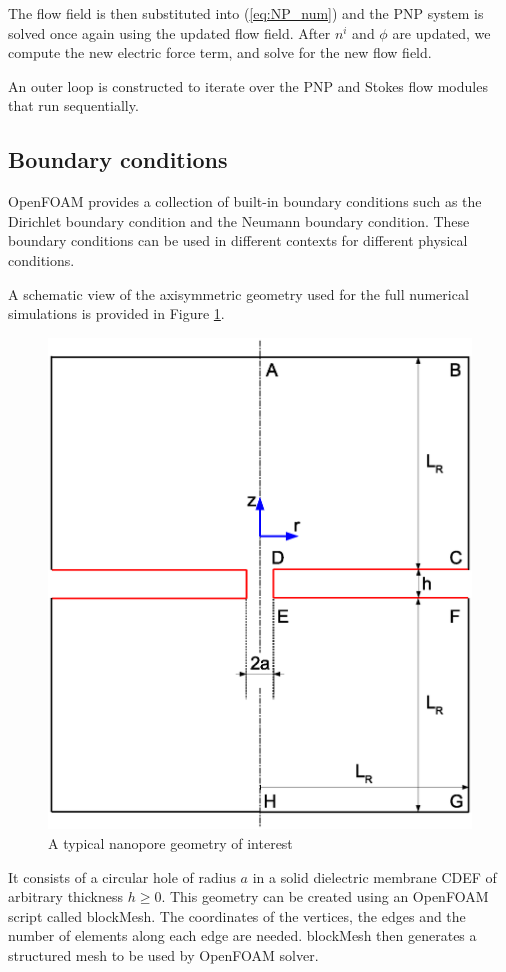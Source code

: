 The flow field is then substituted into (\ref{eq:NP_num}) and the PNP system is solved once again using the updated flow field. After $n^i$ and $\phi$ are updated, we compute the new electric force term, and solve for the new flow field.

An outer loop is constructed to iterate over the PNP and Stokes flow modules that run sequentially.

\subsection{Boundary conditions}
OpenFOAM provides a collection of built-in boundary conditions such as the Dirichlet boundary condition and the Neumann boundary condition. These boundary conditions can be used in different contexts for different physical conditions.

A schematic view of the axisymmetric geometry used for the full numerical simulations is provided in Figure \ref{fig:system_num}. 
\begin{figure}[h]
\centering
\includegraphics[width=1.0\textwidth]{openfoam/figure4.eps}
\caption{A typical nanopore geometry of interest}
\label{fig:system_num}
\end{figure}
It consists of a circular hole of radius $a$ in a solid dielectric membrane CDEF of arbitrary thickness $h\ge 0$. This geometry can be created using an OpenFOAM script called \textsf{blockMesh}. The coordinates of the vertices, the edges and the number of elements along each edge are needed. \textsf{blockMesh} then generates a structured mesh to be used by OpenFOAM solver.

